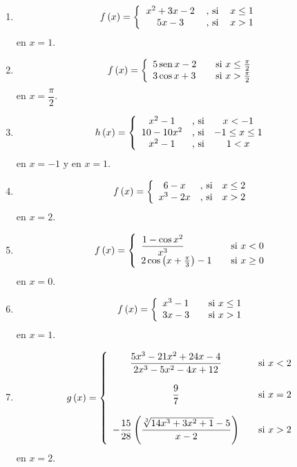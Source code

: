 \begin{enumerate}
\begin{enumerate}
\item
\[
f\left(  x\right)  =\left\{
\begin{tabular}
[c]{ccc}%
$x^{2}+3x-2$ & , si & $x\leq1$\\
$5x-3$ & , si & $x>1$%
\end{tabular}
\ \right.
\]
en $x=1.$

\item
\[
f\left(  x\right)  =\left\{
\begin{array}
[c]{lll}%
5\operatorname{sen}x-2 &  & \text{si }x\leq\tfrac{\pi}{2}\\
3\cos x+3 &  & \text{si }x>\tfrac{\pi}{2}%
\end{array}
\right.
\]
en $x=\dfrac{\pi}{2}.$

\item
\[
h\left(  x\right)  =\left\{
\begin{array}
[c]{ccc}%
x^{2}-1 & \text{, si} & x<-1\\
10-10x^{2} & \text{, si} & -1\leq x\leq1\\
x^{2}-1 & \text{, si} & 1<x
\end{array}
\right.
\]
en $x=-1$ y en $x=1.$

\item
\[
f\left(  x\right)  =\left\{
\begin{array}
[c]{ccc}%
6-x & \text{, si} & x\leq2\\
x^{3}-2x & \text{, si} & x>2
\end{array}
\right.
\]
en $x=2.$

\item
\[
f\left(  x\right)  =\left\{
\begin{array}
[c]{lll}%
\dfrac{1-\cos x^{2}}{x^{3}} &  & \text{si }x<0\\
2\cos\left(  x+\frac{\pi}{3}\right)  -1 &  & \text{si }x\geq0
\end{array}
\right.
\]
en $x=0.$

\item
\[
f\left(  x\right)  =\left\{
\begin{array}
[c]{lll}%
x^{3}-1 &  & \text{si }x\leq1\\
3x-3 &  & \text{si }x>1
\end{array}
\right.
\]
en $x=1.$

\item
\[
g\left(  x\right)  =\left\{
\begin{array}
[c]{ccc}%
\dfrac{5x^{3}-21x^{2}+24x-4}{2x^{3}-5x^{2}-4x+12} &  & \text{si }x<2\\
&  & \\
\dfrac{9}{7} &  & \text{si }x=2\\
&  & \\
-\dfrac{15}{28}\left(  \dfrac{\sqrt[3]{14x^{3}+3x^{2}+1}-5}{x-2}\right)  &  &
\text{si }x>2
\end{array}
\right.
\]
en $x=2.$
\end{enumerate}


\end{enumerate}
